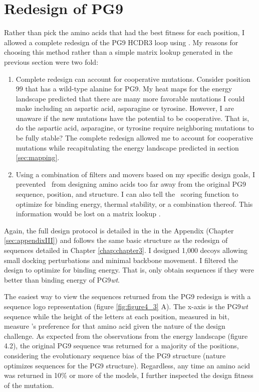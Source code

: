 \section{Redesign of PG9}
Rather than pick the amino acids that had the best fitness for each position, I allowed a complete redesign of the PG9 HCDR3 loop using \rosettadesign. My reasons for choosing this method rather than a simple matrix lookup generated in the previous section were two fold:
\begin{enumerate}
\item Complete redesign can account for cooperative mutations. Consider position 99 that has a wild-type alanine for PG9. My heat maps for the energy landscape predicted that there are many more favorable mutations I could make including an aspartic acid, asparagine or tyrosine. However, I are unaware if the new mutations have the potential to be cooperative. That is, do the aspartic acid, asparagine, or tyrosine require neighboring mutations to be fully stable? The complete redesign allowed me to account for cooperative mutations while recapitulating the energy landscape predicted in section \ref{sec:mapping}.
\item Using a combination of filters and movers based on my specific design goals, I prevented \rosetta~from designing amino acids too far away from the original PG9 sequence, position, and structure. I can also tell the \rosetta~scoring function to optimize for binding energy, thermal stability, or a combination thereof. This information would be lost on a matrix lookup \citep{Fleishman:2011ji,Kaufmann:2010ea,Kuhlman:2000tc}.
\end{enumerate}

Again, the full design protocol is detailed in the in the Appendix (Chapter \ref{sec:appendixIII}) and follows the same basic structure as the redesign of sequences detailed in Chapter \ref{chap:chapter3}. I designed 1,000 decoys allowing small docking perturbations and minimal backbone movement. I filtered the design to optimize for binding energy. That is, only obtain sequences if they were better than binding energy of PG9\textit{wt}.

The easiest way to view the sequences returned from the PG9 redesign is with a sequence logo representation (figure \ref{fig:figure4_3} A). The x-axis is the PG9\textit{wt} sequence while the height of the letters at each position, measured in bit, measure \rosetta's preference for that amino acid given the nature of the design challenge. As expected from the observations from the energy landscape (figure 4.2), the original PG9 sequence was returned for a majority of the positions, considering the evolutionary sequence bias of the PG9 structure (nature optimizes sequences for the PG9 structure).  Regardless, any time an amino acid was returned in 10\% or more of the models, I further inspected the design fitness of the mutation.

